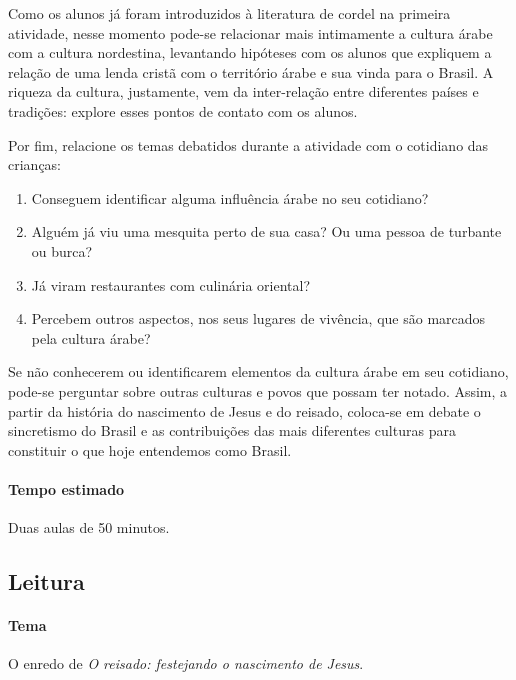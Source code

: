 \documentclass[11pt]{extarticle}
\begin{document}
Como os alunos já foram introduzidos à literatura de cordel na primeira atividade, nesse momento pode-se relacionar mais intimamente a cultura árabe com a cultura nordestina, levantando hipóteses com os alunos que expliquem a relação de uma lenda cristã com o território árabe e sua vinda para o Brasil. A riqueza da cultura, justamente, vem da inter-relação entre diferentes países e tradições: explore esses pontos de contato com os alunos.

Por fim, relacione os temas debatidos durante a atividade com o cotidiano das crianças: 

\begin{enumerate}
\item Conseguem identificar alguma influência árabe no seu cotidiano?

\item Alguém já viu uma mesquita perto de sua casa? Ou uma pessoa de turbante ou burca?

\item Já viram restaurantes com culinária oriental?

\item Percebem outros aspectos, nos seus lugares de vivência, que são marcados pela cultura árabe?
\end{enumerate}

Se não conhecerem ou identificarem elementos da cultura árabe em seu cotidiano, pode-se perguntar sobre outras culturas e povos que possam ter notado. Assim, a partir da história do nascimento de Jesus e do reisado, coloca-se em debate o sincretismo do Brasil e as contribuições das mais diferentes culturas para constituir o que hoje entendemos como Brasil.


\paragraph{Tempo estimado} Duas aulas de 50 minutos.

\subsection{Leitura}



\paragraph{Tema} O enredo de \textit{O reisado: festejando o nascimento de Jesus}.
\end{document}
